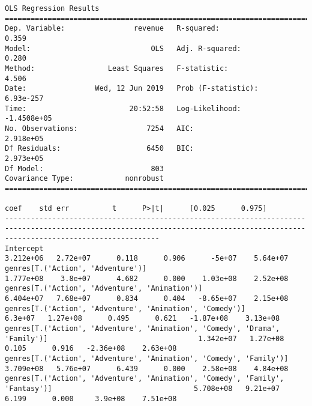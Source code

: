 \documentclass[11pt]{article}
\begin{document}
    \begin{Verbatim}[commandchars=\\\{\}]
                            OLS Regression Results                            
==============================================================================
Dep. Variable:                revenue   R-squared:                       0.359
Model:                            OLS   Adj. R-squared:                  0.280
Method:                 Least Squares   F-statistic:                     4.506
Date:                Wed, 12 Jun 2019   Prob (F-statistic):          6.93e-257
Time:                        20:52:58   Log-Likelihood:            -1.4508e+05
No. Observations:                7254   AIC:                         2.918e+05
Df Residuals:                    6450   BIC:                         2.973e+05
Df Model:                         803                                         
Covariance Type:            nonrobust                                         
================================================================================================================================================================================
                                                                                                                   coef    std err          t      P>|t|      [0.025      0.975]
--------------------------------------------------------------------------------------------------------------------------------------------------------------------------------
Intercept                                                                                                     3.212e+06   2.72e+07      0.118      0.906      -5e+07    5.64e+07
genres[T.('Action', 'Adventure')]                                                                             1.777e+08    3.8e+07      4.682      0.000    1.03e+08    2.52e+08
genres[T.('Action', 'Adventure', 'Animation')]                                                                6.404e+07   7.68e+07      0.834      0.404   -8.65e+07    2.15e+08
genres[T.('Action', 'Adventure', 'Animation', 'Comedy')]                                                        6.3e+07   1.27e+08      0.495      0.621   -1.87e+08    3.13e+08
genres[T.('Action', 'Adventure', 'Animation', 'Comedy', 'Drama', 'Family')]                                   1.342e+07   1.27e+08      0.105      0.916   -2.36e+08    2.63e+08
genres[T.('Action', 'Adventure', 'Animation', 'Comedy', 'Family')]                                            3.709e+08   5.76e+07      6.439      0.000    2.58e+08    4.84e+08
genres[T.('Action', 'Adventure', 'Animation', 'Comedy', 'Family', 'Fantasy')]                                 5.708e+08   9.21e+07      6.199      0.000     3.9e+08    7.51e+08

\end{Verbatim}
\end{document}

